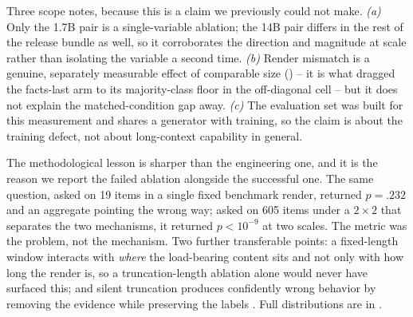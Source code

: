 Three scope notes, because this is a claim we previously could not make. \emph{(a)} Only the 1.7B pair
is a single-variable ablation; the 14B pair differs in the rest of the release bundle as well, so it
corroborates the direction and magnitude at scale rather than isolating the variable a second time.
\emph{(b)} Render mismatch is a genuine, separately measurable effect of comparable size
() -- it is what dragged the facts-last arm to its majority-class floor in
the off-diagonal cell -- but it does not explain the matched-condition gap away. \emph{(c)} The
evaluation set was built for this measurement and shares a generator with training, so the claim is
about the training defect, not about long-context capability in general.

The methodological lesson is sharper than the engineering one, and it is the reason we report the failed
ablation alongside the successful one. The same question, asked on 19 items in a single fixed benchmark
render, returned $p{=}.232$ and an aggregate pointing the wrong way; asked on 605 items under a
$2\times2$ that separates the two mechanisms, it returned $p < 10^{-9}$ at two scales. The metric was
the problem, not the mechanism. Two further transferable points: a fixed-length window interacts with
\emph{where} the load-bearing content sits and not only with how long the render is, so a
truncation-length ablation alone would never have surfaced this; and silent truncation produces
confidently wrong behavior by removing the evidence while preserving the labels
\citep{sambasivan2021datacascades}. Full distributions are in .
